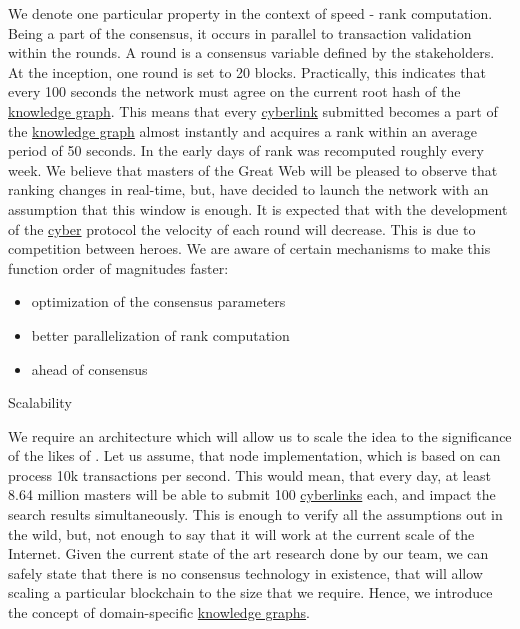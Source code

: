 \documentclass[8pt,oneside]{amsart}
\makeatletter
\newcommand{\linkred}[2]{\href{#1}{\color{red}{#2}}}
\newcommand{\linkgreen}[2]{\href{#1}{\color{green}{#2}}}
\renewcommand\subsection{\@startsection{subsection}
                                    {2}{\z@}
                                    {-3.25ex\@plus -1ex \@minus -.2ex}
                                    {0ex \@plus .2ex}
                                    {\play\Large}
                        }
\newcommand{\titleSection}[1]{\subsection{#1}}
\makeatother
\begin{document}
We denote one particular \linkred{https://github.com/cybercongress/go-cyber}{go-cyber} property in the context of speed - rank computation. Being a part of the consensus, it occurs in parallel to transaction validation within the rounds. A round is a consensus variable defined by the stakeholders. At the inception, one round is set to 20 blocks. Practically, this indicates that every 100 seconds the network must agree on the current root hash of the {\hyperref[knowledge-graph]{knowledge graph}}. This means that every {\hyperref[cyberlinks]{cyberlink}} submitted becomes a part of the {\hyperref[knowledge-graph]{knowledge graph}} almost instantly and acquires a rank within an average period of 50 seconds. In the early days of \linkred{https://google.com}{Google} rank was recomputed roughly every week. We believe that masters of the Great Web will be pleased to observe that ranking changes in real-time, but, have decided to launch the network with an assumption that this window is enough. It is expected that with the development of the {\hyperref[cyber]{cyber}} protocol the velocity of each round will decrease. This is due to competition between heroes. We are aware of certain mechanisms to make this function order of magnitudes faster:

\begin{itemize}
\item optimization of the consensus parameters
\item better parallelization of rank computation
\item \linkgreen{https://ipfs.io/ipfs/QmbsKzizZVVVzPbZvg1qSsNMkwmA3MFufgXb3MFqbSnmPs}{better clock} ahead of consensus
\end{itemize}

\titleSection{Scalability}\label{scalability}

We require an architecture which will allow us to scale the idea to the significance of the likes of \linkred{https://google.com}{Google}. Let us assume, that node implementation, which is based on \linkred{https://github.com/cosmos/cosmos-sdk}{Cosmos-SDK} can process 10k transactions per second. This would mean, that every day, at least 8.64 million masters will be able to submit 100 {\hyperref[cyberlinks]{cyberlinks}} each, and impact the search results simultaneously. This is enough to verify all the assumptions out in the wild, but, not enough to say that it will work at the current scale of the Internet. Given the current state of the art research done by our team, we can safely state that there is no consensus technology in existence, that will allow scaling a particular blockchain to the size that we require. Hence, we introduce the concept of domain-specific {\hyperref[knowledge-graph]{knowledge graphs}}.
\end{document}
